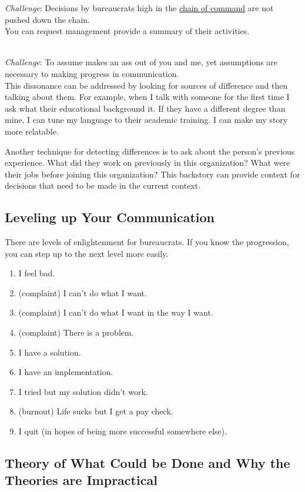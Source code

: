 \textit{Challenge}: Decisions by bureaucrats high in the \href{https://en.wikipedia.org/wiki/Command_hierarchy}{chain of command} are not pushed down the chain. \\
You can request management provide a summary of their activities.

\ \\
\textit{Challenge}: To assume makes an ass out of you and me, 
yet assumptions are necessary to making progress in communication.\\ 
This dissonance can be addressed by looking for sources of difference and then talking about them. For example, when I talk with someone for the first time I ask what their educational background it. If they have a different degree than mine, I can tune my language to their academic training. I can make my story more relatable. 

Another technique for detecting differences is to ask about the person's previous experience. What did they work on previously in this organization? What were their jobs before joining this organization? This backstory can provide context for decisions that need to be made in the current context. 

\subsection*{Leveling up Your Communication}

There are levels of enlightenment for bureaucrats. If you know the progression, you can step up to the next level more easily.
\begin{enumerate}
    \item I feel bad.
    \item (complaint) I can't do what I want.
    \item (complaint) I can't do what I want in the way I want.
    \item (complaint) There is a problem.
    \item I have a solution.
    \item I have an implementation.
    \item I tried but my solution didn't work.
    \item (burnout) Life sucks but I get a pay check.
    \item I quit (in hopes of being more successful somewhere else).
\end{enumerate}


\subsection*{Theory of What Could be Done and Why the Theories are Impractical}

